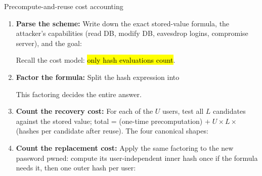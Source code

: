 \documentclass[12pt, a4paper]{article}
\newcommand{\term}[1]{\textbf{\textit{#1}}}        %
\newcommand{\imp}[1]{\hl{#1}}                       %
\begin{document}
\begin{schemebox}{Precompute-and-reuse cost accounting}
\begin{enumerate}[label=\textbf{Step \arabic*:}, leftmargin=*]
    \item \textbf{Parse the scheme:} Write down the exact stored-value formula, the attacker's capabilities (read DB, modify DB, eavesdrop logins, compromise server), and the goal:
    Recall the cost model: \imp{only hash evaluations count}.
    \item \textbf{Factor the formula:} Split the hash expression into
    This factoring decides the entire answer.
    \item \textbf{Count the recovery cost:} For each of the $U$ users, test all $L$ candidates against the stored value; total = (one-time precomputation) $+\; U \times L \times$ (hashes per candidate after reuse). The four canonical shapes:
    \item \textbf{Count the replacement cost:} Apply the same factoring to the new password pwned: compute its user-independent inner hash once if the formula needs it, then one outer hash per user:

\end{enumerate}
\end{schemebox}
\end{document}
